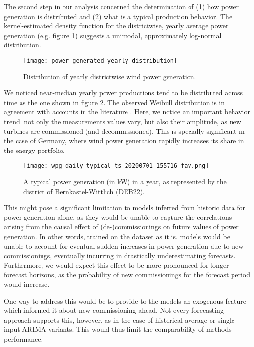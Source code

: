 The second step in our analysis concerned the determination of (1) how power generation is distributed and (2) what is a typical production behavior.
The kernel-estimated density function for the districtwise, yearly average power generation (e.g. figure \ref{fig:yearly_power_generation}) suggests a unimodal, approximately log-normal distribution.

\begin{figure}[H]%
	\centering
    \caption{Distribution of yearly districtwise wind power generation.}
    \texttt{[image: power-generated-yearly-distribution]}
	\label{fig:yearly_power_generation}
\end{figure}

We noticed near-median yearly power productions tend to be distributed across time as the one shown in figure \ref{fig:deb22_production_2015}.
The observed Weibull distribution is in agreement with accounts in the literature \cite{blaabjerg2017electronics, engeland2017variability, he2014short-term}.
Here, we notice an important behavior trend: not only the measurements values vary, but also their amplitude, as new turbines are commissioned (and decommissioned).
This is specially significant in the case of Germany, where wind power generation rapidly increases its share in the energy portfolio.

\begin{figure}[H]%
	\centering
    \caption{A typical power generation (in kW) in a year, as represented by the district of Bernkastel-Wittlich (DEB22).}
    \texttt{[image: wpg-daily-typical-ts\_20200701\_155716\_fav.png]}
	\label{fig:deb22_production_2015}
\end{figure}

This might pose a significant limitation to models inferred from historic data for power generation alone, as they would be unable to capture the correlations arising from the causal effect of (de-)commissionings on future values of power generation.
In other words, trained on the dataset as it is, models would be unable to account for eventual sudden increases in power generation due to new commissionings, eventually incurring in drastically underestimating forecasts.
Furthermore, we would expect this effect to be more pronounced for longer forecast horizons, as the probability of new commissionings for the forecast period would increase.

One way to address this would be to provide to the models an exogenous feature which informed it about new commissioning ahead.
Not every forecasting approach supports this, however, as in the case of historical average or single-input ARIMA variants.
This would thus limit the comparability of methods performance.

